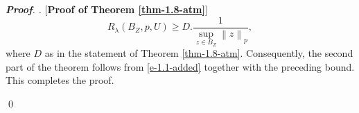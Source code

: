 \documentclass[a4paper,11pt, reqno]{amsart}
\theoremstyle{definition}
\newenvironment{pf}[1][]{%
	\vskip 3mm
	\noindent
	\ifthenelse{\equal{#1}{}}%
	{{\slshape {\bf Proof}. }}%
	{{\slshape #1.} }%
}%
{\qed\bigskip}
\newcommand{\norm}[1]{\left\lVert#1\right\rVert}
\newcommand{\comment}[1]{}
\begin{document}
\begin{pf} [{\bf Proof of Theorem \ref{thm-1.8-atm}}]
\begin{equation*}
			R_{\lambda}(B_{Z}, p,U) \geq D. \frac{1}{\sup_{z \in B_{Z}}\norm{z}_{p}},
		\end{equation*}
	where $D$ as in the statement of Theorem \ref{thm-1.8-atm}.
		 Consequently, the second part of the theorem follows from \eqref{e-1.1-added} together with the preceding bound. This completes the proof.	
		\comment{We now only need to show that
			\begin{equation}\label{Pal-Vasu-P3-e-2.13}
				AP_\lambda(B_{Z},p,U) \leq \frac{\norm{Id: Z \rightarrow \ell^n_{1}}}{n} \, R_\lambda(B_{Z},p,U).
			\end{equation}
			Let $r=(r_1,.\,.\,., r_n)\in \mathbb{R}^n_{\geq 0}$ be such that 
			\begin{equation*}
				\sum_{m=0}^{\infty} \sum_{|\alpha|=m} (\norm{U(c_{\alpha})}^p_{Y} + \norm{U(d_{\alpha})}^p_{Y})r^{p \alpha} \leq \lambda^{p} \norm{g}^p_{B_{Z}, \mathcal{B}(\mathcal{H})}	
			\end{equation*}
			for all $g(z)=\sum_{m=0}^{\infty} \sum_{|\alpha|=m} c_{\alpha}\, z^{\alpha} + \sum_{m=1}^{\infty} \sum_{|\alpha|=m} d^{*}_{\alpha}\, \bar{z}^{\alpha}\in \mathcal{PH}(B_{z},\mathcal{B}(\mathcal{H}))$. Then, there exists $\tilde{z}=(z_1,\ldots,z_n)\in R_\lambda(B_{Z},p,U)\overline{B_{Z}}$ with $|z_j|=r_j$ for $1\leq j\leq n$ satisfying $\norm{\tilde{z}}=\norm{r}\leq R_\lambda(B_{Z},p,U)$ and
			\begin{equation*}
				\sum_{m=0}^{\infty} \sum_{|\alpha|=m} (\norm{U(c_{\alpha})}^p_{Y} + \norm{U(d_{\alpha})}^p_{Y})|\tilde{z}|^{p \alpha} \leq \lambda^{p} \norm{g}^p_{B_{Z}, \mathcal{B}(\mathcal{H})}.
			\end{equation*}
			To prove \eqref{Pal-Vasu-P3-e-2.13}, it suffices to show that $	\norm{r}_{1}/\norm{Id: Z \rightarrow \ell^n_{1}} \leq R_\lambda(B_{Z},p,U)$.
			Fix $f\in \mathcal{PH}(B_{z},\mathcal{B}(\mathcal{H}))$ be of the form \eqref{e-1.3-a}, then for $v\in \frac{\norm{r}_1}{\norm{Id: Z \rightarrow \ell^n_{1}}}\overline{B_{Z}}$, we have $\norm{v}\leq \norm{r}\leq R_\lambda(B_{Z},p,U)$.
			Hence, by the virtue of the definition of Bohr radius we obtain
			\begin{equation*}
				\sum_{m=0}^{\infty} \sum_{|\alpha|=m} (\norm{U(a_{\alpha})}^p_{Y} + \norm{U(b_{\alpha})}^p_{Y})|v|^{p \alpha} \leq \lambda^{p} \norm{g}^p_{B_{Z}, \mathcal{B}(\mathcal{H})}
			\end{equation*}
			for every $v\in \frac{\norm{r}_1}{\norm{Id: Z \rightarrow \ell^n_{1}}}\overline{B_{Z}}$. Therefore, it follows that
			$\norm{r}_1 \leq \norm{Id: Z \rightarrow \ell^n_{1}} \, R_\lambda(B_{Z},p,U)$, 
			which gives our conclusion.  This completes the proof.}
	\end{pf}
\end{document}
